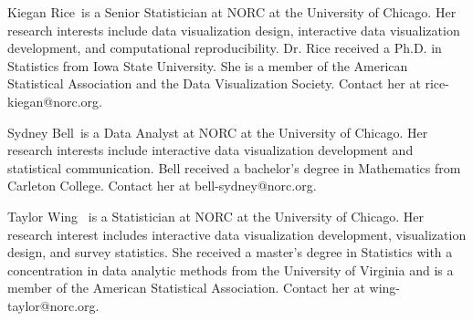 \documentclass{IEEEcsmag}
\begin{document}
% 
% 
% 
% 


\begin{IEEEbiography}{Kiegan Rice}{\,} is a Senior Statistician at NORC at the University of Chicago. Her research interests include data visualization design, interactive data visualization development, and computational reproducibility. Dr. Rice received a Ph.D. in Statistics from Iowa State University. She is a member of the American Statistical Association and the Data Visualization Society. Contact her at rice-kiegan@norc.org.%
\end{IEEEbiography}

\begin{IEEEbiography}{Sydney Bell}{\,} is a Data Analyst at NORC at the University of Chicago.  Her research interests include interactive data visualization development and statistical communication. Bell received a bachelor's degree in Mathematics from Carleton College. Contact her  at bell-sydney@norc.org.\vspace*{8pt}
\end{IEEEbiography}

\begin{IEEEbiography}{Taylor Wing} {\,} is a Statistician at NORC at the University of Chicago. Her research interest includes interactive data visualization development, visualization design, and survey statistics. She received a master’s degree in Statistics with a concentration in data analytic methods from the University of Virginia and is a member of the American Statistical Association. Contact her at wing-taylor@norc.org.\vspace*{8pt}
\end{IEEEbiography}
\end{document}
